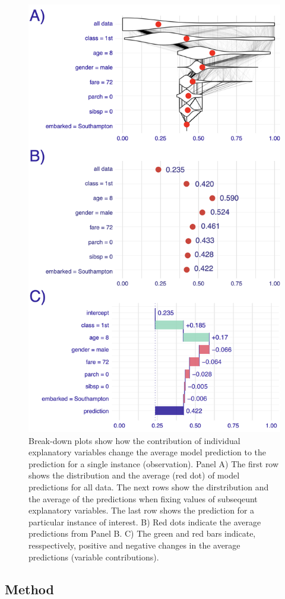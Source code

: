 \documentclass[12pt,]{krantz}
\begin{document}
\begin{figure}

{\centering \includegraphics[width=0.7\linewidth]{figure/break_down_distr} 

}

\caption{Break-down plots show how the contribution of individual explanatory variables change the average model prediction to the prediction for a single instance (observation). Panel A) The first row shows the distribution and the average (red dot) of model predictions for all data. The next rows show the dirstribution and the average of the predictions when fixing values of subseqeunt explanatory variables. The last row shows the prediction for a particular instance of interest. B) Red dots indicate the average predictions from Panel B. C) The green and red bars indicate, resspectively, positive and negative changes in the average predictions (variable contributions). }\label{fig:BDPrice4}
\end{figure}

\hypertarget{BDMethod}{%
\subsection{Method}\label{BDMethod}}
\end{document}
